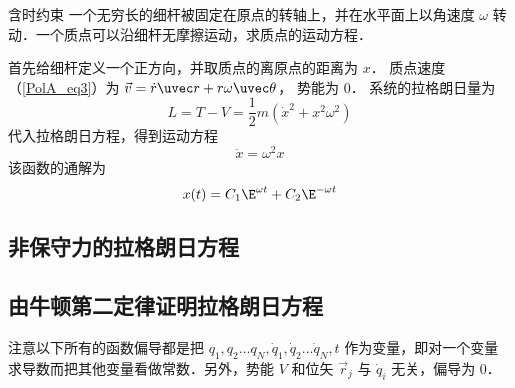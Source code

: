 \begin{exam}{含时约束}
一个无穷长的细杆被固定在原点的转轴上，并在水平面上以角速度 $\omega$ 转动．一个质点可以沿细杆无摩擦运动，求质点的运动方程．

首先给细杆定义一个正方向，并取质点的离原点的距离为 $x$． 质点速度（\autoref{PolA_eq3}）为 $\vec v = \dot r \uvec r + r\omega \uvec\theta$， 势能为 0． 系统的拉格朗日量为
\begin{equation}
L = T - V = \frac12 m(\dot x^2 + x^2 \omega^2)
\end{equation}
代入拉格朗日方程，得到运动方程
\begin{equation}
\ddot x = \omega^2 x
\end{equation}
该函数的通解为%
\begin{equation}
x(t) = C_1 \E^{\omega t} + C_2 \E^{-\omega t}
\end{equation}
\end{exam}

\subsection{非保守力的拉格朗日方程}


\subsection{由牛顿第二定律证明拉格朗日方程}
注意以下所有的函数偏导都是把 $q_1, q_2\dots q_N, \dot q_1, \dot q_2\dots \dot q_N, t$ 作为变量，即对一个变量求导数而把其他变量看做常数．另外，势能 $V$ 和位矢 $\vec r_j$ 与 $\dot q_i$ 无关，偏导为 0．

